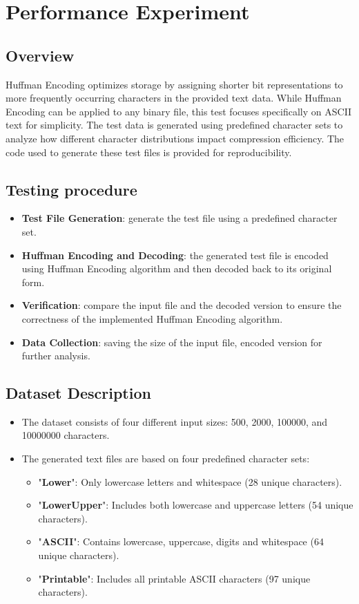 \section{Performance Experiment}
\subsection{Overview}
Huffman Encoding optimizes storage by assigning shorter bit representations to more frequently occurring characters in the provided text data. While Huffman Encoding can be applied to any binary file, this test focuses specifically on ASCII text for simplicity. The test data is generated using predefined character sets to analyze how different character distributions impact compression efficiency. The code used to generate these test files is provided for reproducibility.
\subsection{Testing procedure}
\begin{itemize}
    \item \textbf{Test File Generation}: generate the test file using a predefined character set.
    \item \textbf{Huffman Encoding and Decoding}: the generated test file is encoded using Huffman Encoding algorithm and then decoded back to its original form.
    \item \textbf{Verification}: compare the input file and the decoded version to ensure the correctness of the implemented Huffman Encoding algorithm.
    \item \textbf{Data Collection}: saving the size of the input file, encoded version for further analysis.
\end{itemize}
\subsection{Dataset Description}
\begin{itemize}
    \item The dataset consists of four different input sizes: 500, 2000, 100000, and 10000000 characters.
    \item The generated text files are based on four predefined character sets: \begin{itemize}
        \item "\textbf{Lower}": Only lowercase letters and whitespace (28 unique characters).
        \item "\textbf{LowerUpper}": Includes both lowercase and uppercase letters (54 unique characters).
        \item "\textbf{ASCII}": Contains lowercase, uppercase, digits and whitespace (64 unique characters).
        \item "\textbf{Printable}": Includes all printable ASCII characters (97 unique characters).
    \end{itemize}
\end{itemize}
